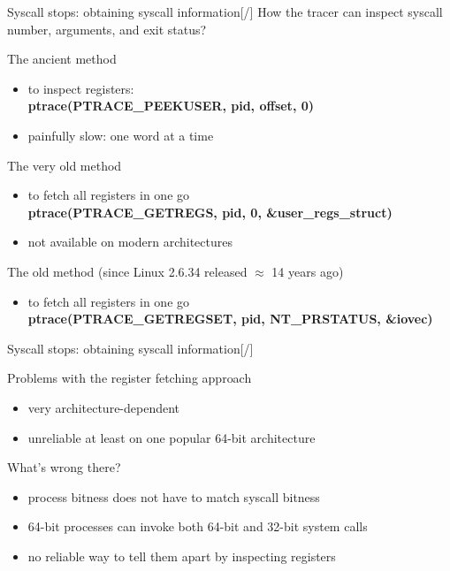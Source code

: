 \documentclass[unicode,aspectratio=169,xcolor={table,dvipsnames,usenames}]{beamer}
\begin{document}
\begin{frame}{\Large Syscall stops: obtaining syscall information\hfill [\insertframenumber/\inserttotalframenumber]}
How the tracer can inspect syscall number, arguments, and exit status?

\begin{block}{The ancient method}
\begin{itemize}
	\item to inspect registers: \\
		\textbf{ptrace(PTRACE\_PEEKUSER, pid, offset, 0)}
	\item painfully slow: one word at a time
\end{itemize}
\end{block}

\begin{block}{The very old method}
\begin{itemize}
	\item to fetch all registers in one go \\
		\textbf{ptrace(PTRACE\_GETREGS, pid, 0, \&user\_regs\_struct)}
	\item not available on modern architectures
\end{itemize}
\end{block}

\begin{block}{The old method (since Linux 2.6.34 released $\approx$ 14 years ago)}
\begin{itemize}
	\item to fetch all registers in one go \\
		\textbf{ptrace(PTRACE\_GETREGSET, pid, NT\_PRSTATUS, \&iovec)}
\end{itemize}
\end{block}
\end{frame}

\begin{frame}{\Large Syscall stops: obtaining syscall information\hfill [\insertframenumber/\inserttotalframenumber]}
\Large
\begin{block}{Problems with the register fetching approach}
\begin{itemize}
	\item very architecture-dependent
	\item unreliable at least on one popular 64-bit architecture
\end{itemize}
\end{block}

\begin{block}{What's wrong there?}
\begin{itemize}
	\item process bitness does not have to match syscall bitness
	\item 64-bit processes can invoke both 64-bit and 32-bit system calls
	\item no reliable way to tell them apart by inspecting registers
\end{itemize}
\end{block}
\end{frame}
\end{document}
